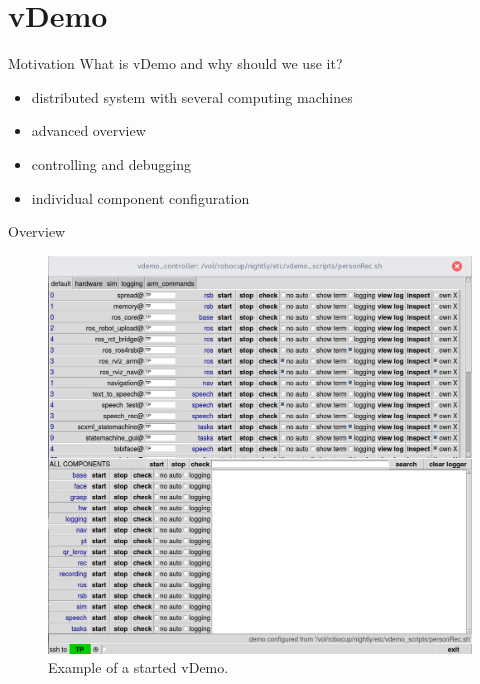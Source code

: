 \section{vDemo}

\begin{frame}[fragile]{Motivation}
	\alert{What is vDemo and why should we use it?}
	\begin{itemize}
		\item distributed system with several computing machines
		\item advanced overview %
		\item controlling and debugging %
		\item individual component configuration 
	\end{itemize}
	
	
\end{frame}

\begin{frame}[fragile]{Overview}
	
	\begin{figure}
		\includegraphics[scale=0.185]{vdemo_overview.png}
		\caption{Example of a started vDemo.}
	\end{figure}
	
\end{frame}


